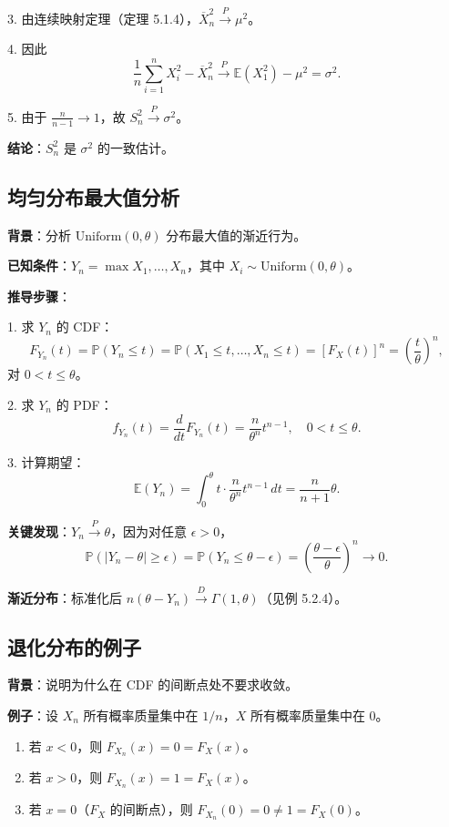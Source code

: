 3. 由连续映射定理（定理 5.1.4），$\overline{X}_n^2 \xrightarrow{P} \mu^2$。

4. 因此
\[
\frac{1}{n}\sum_{i=1}^n X_i^2 - \overline{X}_n^2 \xrightarrow{P} \mathbb{E}(X_1^2) - \mu^2 = \sigma^2.
\]

5. 由于 $\frac{n}{n-1} \to 1$，故 $S_n^2 \xrightarrow{P} \sigma^2$。

\textbf{结论}：$S_n^2$ 是 $\sigma^2$ 的一致估计。

\subsection{均匀分布最大值分析}\label{sec:uniform-max-derivation}

\textbf{背景}：分析 $\mathrm{Uniform}(0, \theta)$ 分布最大值的渐近行为。

\textbf{已知条件}：$Y_n = \max{X_1, \ldots, X_n}$，其中 $X_i \sim \mathrm{Uniform}(0, \theta)$。

\textbf{推导步骤}：

1. 求 $Y_n$ 的 CDF：
\[
F_{Y_n}(t) = \mathbb{P}(Y_n \leq t) = \mathbb{P}(X_1 \leq t, \ldots, X_n \leq t) = [F_X(t)]^n = \left(\frac{t}{\theta}\right)^n,
\]
对 $0 < t \leq \theta$。

2. 求 $Y_n$ 的 PDF：
\[
f_{Y_n}(t) = \frac{d}{dt}F_{Y_n}(t) = \frac{n}{\theta^n}t^{n-1},\quad 0 < t \leq \theta.
\]

3. 计算期望：
\[
\mathbb{E}(Y_n) = \int_0^\theta t \cdot \frac{n}{\theta^n}t^{n-1}\,dt = \frac{n}{n+1}\theta.
\]

\textbf{关键发现}：$Y_n \xrightarrow{P} \theta$，因为对任意 $\epsilon > 0$，
\[
\mathbb{P}(|Y_n - \theta| \geq \epsilon) = \mathbb{P}(Y_n \leq \theta - \epsilon) = \left(\frac{\theta - \epsilon}{\theta}\right)^n \to 0.
\]

\textbf{渐近分布}：标准化后 $n(\theta - Y_n) \xrightarrow{D} \Gamma(1, \theta)$（见例 5.2.4）。

\subsection{退化分布的例子}\label{sec:degenerate-distribution}

\textbf{背景}：说明为什么在 CDF 的间断点处不要求收敛。

\textbf{例子}：设 $X_n$ 所有概率质量集中在 $1/n$，$X$ 所有概率质量集中在 $0$。

\begin{enumerate}
\item 若 $x < 0$，则 $F_{X_n}(x) = 0 = F_X(x)$。
\item 若 $x > 0$，则 $F_{X_n}(x) = 1 = F_X(x)$。
\item 若 $x = 0$（$F_X$ 的间断点），则 $F_{X_n}(0) = 0 \neq 1 = F_X(0)$。
\end{enumerate}

